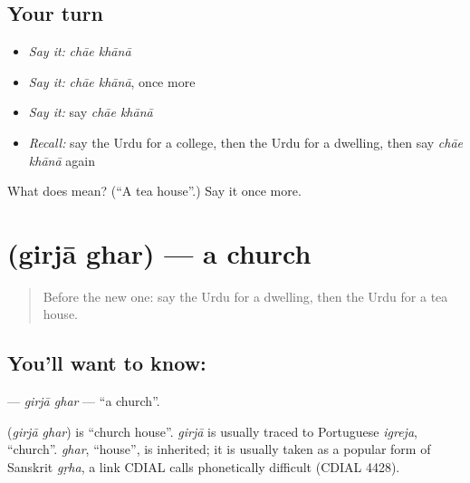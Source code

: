 \subsection*{Your turn}
\begin{itemize}
\raggedright
  \item \emph{Say it:} \emph{chāe khānā}
  \item \emph{Say it:} \emph{chāe khānā}, once more
  \item \emph{Say it:} say \emph{chāe khānā}
  \item \emph{Recall:} say the Urdu for a college, then the Urdu for a dwelling, then say \emph{chāe khānā} again
\end{itemize}

\begin{tcolorbox}[breakable,colback=teal!4,colframe=teal!35!black,title={Before you move on}]
What does   mean? (\textquotedblleft{}A tea house\textquotedblright{}.) Say it once more.
\end{tcolorbox}
\section[\texorpdfstring{\ur{گرجا} \ur{گھر} (girjā ghar)}{گرجا گھر (girjā ghar)}]{  (girjā ghar) — a church}

\label{lesson:UR-C191-girja-ghar}



\begin{quote}
Before the new one: say the Urdu for a dwelling, then the Urdu for a tea house.
\end{quote}

\subsection*{You'll want to know:  }
\textbf{ } — \emph{girjā ghar} — \textquotedblleft{}a church\textquotedblright{}.

\begin{cousinweb}
\textbf{ } (\emph{girjā ghar}) is \textquotedblleft{}church house\textquotedblright{}. \emph{girjā} is usually traced to Portuguese \emph{igreja}, \textquotedblleft{}church\textquotedblright{}. \emph{ghar}, \textquotedblleft{}house\textquotedblright{}, is inherited; it is usually taken as a popular form of Sanskrit \emph{gṛha}, a link CDIAL calls phonetically difficult (CDIAL 4428).
\end{cousinweb}

